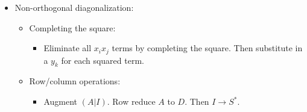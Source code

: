 \documentclass[../../notes.tex]{subfiles}
\begin{document}
\begin{itemize}
\begin{itemize}
    \end{itemize}
    \item Non-orthogonal diagonalization:
    \begin{itemize}
        \item Completing the square:
        \begin{itemize}
            \item Eliminate all $x_ix_j$ terms by completing the square. Then substitute in a $y_k$ for each squared term.
        \end{itemize}
        \item Row/column operations:
        \begin{itemize}
            \item Augment $(A|I)$. Row reduce $A$ to $D$. Then $I\to S^*$.
        \end{itemize}
    \end{itemize}
\end{itemize}
\end{document}
